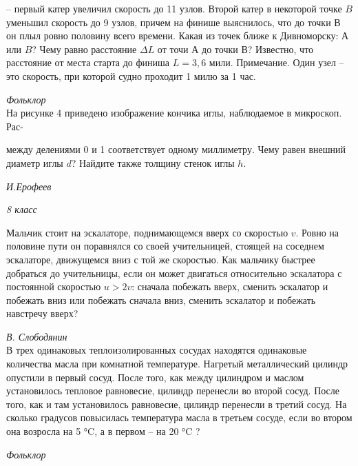 \newpage
\small
\pagestyle{fancy}
\lhead{\thepage}
\begin{multicols}{2}
\noindent– первый катер увеличил скорость до 11 узлов. Второй катер в некоторой точке $B$ уменьшил скорость до 9 узлов, причем на финише выяснилось, что до точки $В$ он плыл ровно половину всего времени. Какая из точек ближе к Дивноморску: $А$ или $B$? Чему равно расстояние $\Delta L$ от точи $А$ до точки $В$? Известно, что расстояние от места старта до финиша $L = 3,6$ мили. Примечание. Один узел – это скорость, при которой судно проходит 1 милю за 1 час.\\
\strut\hfill {\it Фольклор}\\

 На рисунке 4 приведено изображение кончика иглы, наблюдаемое в микроскоп. Рас-
\begin{figure}[H]
\end{figure}
 между делениями 0 и 1 соответствует одному миллиметру. Чему равен внешний диаметр иглы $d$? Найдите также толщину стенок иглы $h$.\\
\strut\hfill {\it И.Ерофеев}
\begin{center}
{\it8 класс}
\end{center}

 Мальчик стоит на эскалаторе, поднимающемся вверх со скоростью $v$. Ровно на половине пути он поравнялся со своей учительницей, стоящей на соседнем эскалаторе, движущемся вниз с той же скоростью. Как мальчику быстрее добраться до учительницы, если он может двигаться относительно эскалатора с постоянной скоростью $u > 2v$: сначала побежать вверх, сменить эскалатор и побежать вниз или побежать сначала вниз, сменить эскалатор и побежать навстречу вверх?\\
\strut\hfill {\it В. Слободянин}\\

 В трех одинаковых теплоизолированных сосудах находятся одинаковые количества масла при комнатной температуре. Нагретый металлический цилиндр опустили в первый сосуд. После того, как между цилиндром и маслом установилось тепловое равновесие, цилиндр перенесли во второй сосуд. После того, как и там установилось равновесие, цилиндр перенесли в  третий сосуд. На сколько градусов повысилась температура масла в третьем сосуде, если во втором она возросла на 5 °C, а в первом – на 20 °C ?\\
\strut\hfill {\it Фольклор}\\


\end{multicols}
